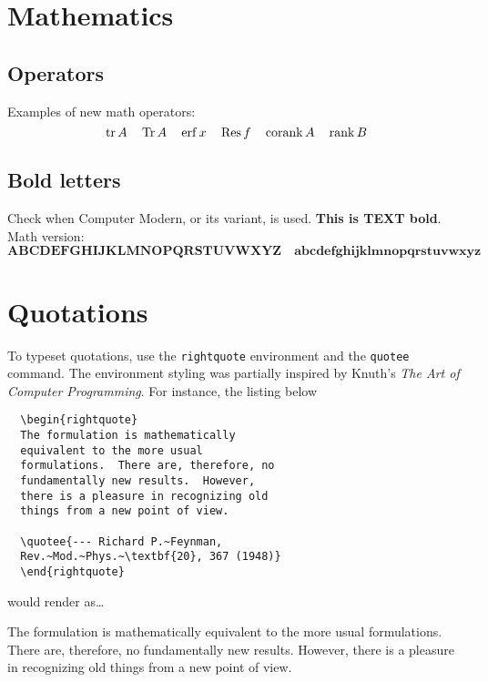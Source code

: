 \documentclass{article}
\begin{document}
\section{Mathematics}

\subsection{Operators}

Examples of new math operators:
\begin{equation}
  \operatorname{tr}{A}\quad \operatorname{Tr}{A}\quad \operatorname{erf}{x}\quad \operatorname{Res}{f}\quad \operatorname{corank}{A}\quad \operatorname{rank}{B}
\end{equation}

\subsection{Bold letters}

Check when Computer Modern, or its variant, is used. \textbf{This is TEXT bold}.  Math version:
\begin{equation}
  \mathbf{ABCDEFGHIJKLMNOPQRSTUVWXYZ}\quad \mathbf{abcdefghijklmnopqrstuvwxyz}
\end{equation}

\section{Quotations}

\thetitle

\theheadtitle

To typeset quotations, use the \verb|rightquote| environment and the \verb|quotee| command.
The environment styling was partially inspired by Knuth's \emph{The Art of Computer Programming}.
For instance, the listing below

\begin{verbatim}
  \begin{rightquote}
  The formulation is mathematically
  equivalent to the more usual
  formulations.  There are, therefore, no
  fundamentally new results.  However,
  there is a pleasure in recognizing old
  things from a new point of view.

  \quotee{--- Richard P.~Feynman,
  Rev.~Mod.~Phys.~\textbf{20}, 367 (1948)}
  \end{rightquote}
\end{verbatim}

\noindent would render as\ldots

\begin{rightquote}
The formulation is mathematically
equivalent to the more usual
formulations.  There are, therefore, no
fundamentally new results.  However,
there is a pleasure in recognizing old
things from a new point of view.

\end{rightquote}
\end{document}
